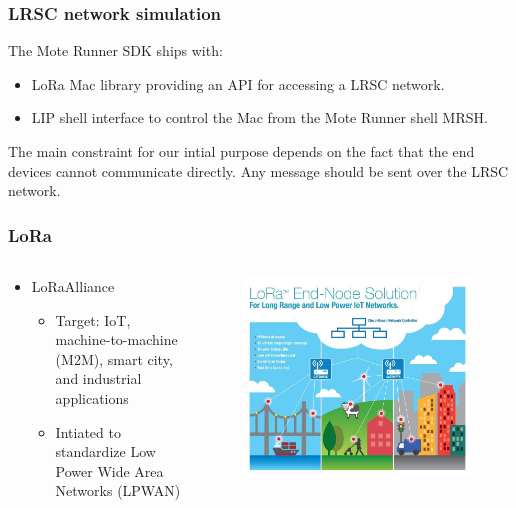 \begin{frame}[fragile]
  \frametitle{LRSC network simulation}
    	The Mote Runner SDK ships with:
    	\begin{itemize}
	  \item LoRa Mac library providing an API for accessing a LRSC network. 
	  \item LIP shell interface to control the Mac from the Mote Runner shell MRSH.
    	\end{itemize}
  The main constraint for our intial purpose depends on the fact that the end devices cannot communicate directly. Any message should be sent over the LRSC network.
\end{frame}

\begin{frame}[fragile]
  \frametitle{LoRa\texttrademark}
  \begin{columns}
    \begin{column}{.48\linewidth}
      \begin{itemize}
	\item LoRa\texttrademark Alliance
	\begin{itemize}
	  \item Target: IoT,  machine-to-machine (M2M), smart city, and industrial applications
	  \item Intiated to standardize Low Power Wide Area Networks (LPWAN)
	\end{itemize}
      \end{itemize}
    \end{column}
    \hfill
    \begin{column}{.48\linewidth}
    	\begin{figure}
	  \centering
	  \includegraphics[width=\linewidth]{img/lora.jpg}
    	\end{figure}

    \end{column}
  \end{columns}
\end{frame}


